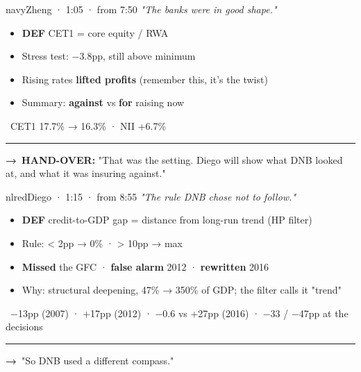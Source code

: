 \documentclass[10pt]{article}
\begin{document}
\begin{card}{navy}{\hfill{\normalsize\mdseries Zheng · 1:05 · from 7:50}}
{\large\itshape "The banks were in good shape."}\par\smallskip
\begin{itemize}[label=\textcolor{navy}{\textbullet}]\item \textcolor{gold!80!black}{\textbf{DEF}} CET1 = core equity / RWA\item Stress test: −3.8pp, still above minimum\item Rising rates \textbf{lifted profits} (remember this, it's the twist)\item Summary: \textbf{against} vs \textbf{for} raising now\end{itemize}
\smallskip{\color{navy}\textbf{\#}}\ CET1 17.7\% → 16.3\% · NII +6.7\%\par
\vfill\textcolor{grey}{\rule{\linewidth}{0.3pt}}\par{\bfseries\color{navy}→}\ \textbf{\textcolor{nlred}{\textbf{HAND-OVER:}}} "That was the setting. Diego will show what DNB looked at, and what it was insuring against."
\end{card}
\hfill
\begin{card}{nlred}{\hfill{\normalsize\mdseries Diego · 1:15 · from 8:55}}
{\large\itshape "The rule DNB chose \emph{not} to follow."}\par\smallskip
\begin{itemize}[label=\textcolor{nlred}{\textbullet}]\item \textcolor{gold!80!black}{\textbf{DEF}} credit-to-GDP gap = distance from long-run trend (HP filter)\item Rule: < 2pp → 0\% · > 10pp → max\item \textbf{Missed} the GFC · \textbf{false alarm} 2012 · \textbf{rewritten} 2016\item Why: structural deepening, 47\% → 350\% of GDP; the filter calls it "trend"\end{itemize}
\smallskip{\color{nlred}\textbf{\#}}\ −13pp (2007) · +17pp (2012) · −0.6 vs +27pp (2016) · −33 / −47pp at the decisions\par
\vfill\textcolor{grey}{\rule{\linewidth}{0.3pt}}\par{\bfseries\color{nlred}→}\ "So DNB used a different compass."
\end{card}


\vspace{0.35cm}
\end{document}
